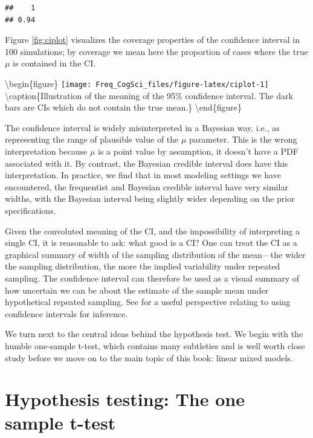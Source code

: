 \documentclass[12pt,]{krantz}
\begin{document}
\begin{verbatim}
##    1 
## 0.94
\end{verbatim}

Figure \ref{fig:ciplot} visualizes the coverage properties of the confidence interval in 100 simulations; by coverage we mean here the proportion of cases where the true \(\mu\) is contained in the CI.

\textbackslash{}begin\{figure\}
\texttt{[image: Freq\_CogSci\_files/figure-latex/ciplot-1]} \textbackslash{}caption\{Illustration of the meaning of the 95\% confidence interval. The dark bars are CIs which do not contain the true mean.\}\label{fig:ciplot}
\textbackslash{}end\{figure\}

The confidence interval is widely misinterpreted in a Bayesian way, i.e., as representing the range of plausible value of the \(\mu\) parameter. This is the wrong interpretation because \(\mu\) is a point value by assumption, it doesn't have a PDF associated with it. By contrast, the Bayesian credible interval does have this interpretation.
In practice, we find that in most modeling settings we have encountered, the frequentist and Bayesian credible interval have very similar widths, with the Bayesian interval being slightly wider depending on the prior specifications.

Given the convoluted meaning of the CI, and the impossibility of interpreting a single CI, it is reasonable to ask: what good is a CI? One can treat the CI as a graphical summary of width of the sampling distribution of the mean---the wider the sampling distribution, the more the implied variability under repeated sampling. The confidence interval can therefore be used as a visual summary of how uncertain we can be about the estimate of the sample mean under hypothetical repeated sampling. See \citet{cumming2014new} for a useful perspective relating to using confidence intervals for inference.

We turn next to the central ideas behind the hypothesis test. We begin with the humble one-sample t-test, which contains many subtleties and is well worth close study before we move on to the main topic of this book: linear mixed models.

\hypertarget{hypothesis-testing-the-one-sample-t-test}{%
\section{Hypothesis testing: The one sample t-test}\label{hypothesis-testing-the-one-sample-t-test}}
\end{document}
